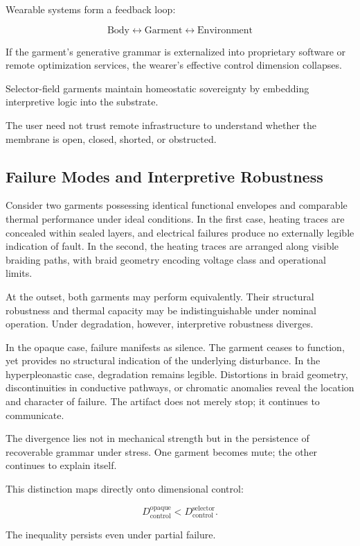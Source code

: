 \documentclass[11pt]{article}
\begin{document}
Wearable systems form a feedback loop:

\[
\text{Body} \leftrightarrow \text{Garment} \leftrightarrow \text{Environment}
\]

If the garment's generative grammar is externalized into proprietary 
software or remote optimization services, the wearer’s effective 
control dimension collapses.

Selector-field garments maintain homeostatic sovereignty by 
embedding interpretive logic into the substrate.

The user need not trust remote infrastructure to understand 
whether the membrane is open, closed, shorted, or obstructed.

\subsection{Failure Modes and Interpretive Robustness}

Consider two garments possessing identical functional envelopes and
comparable thermal performance under ideal conditions. In the first
case, heating traces are concealed within sealed layers, and electrical
failures produce no externally legible indication of fault. In the
second, the heating traces are arranged along visible braiding paths,
with braid geometry encoding voltage class and operational limits.

At the outset, both garments may perform equivalently. Their structural
robustness and thermal capacity may be indistinguishable under nominal
operation. Under degradation, however, interpretive robustness diverges.

In the opaque case, failure manifests as silence. The garment ceases to
function, yet provides no structural indication of the underlying
disturbance. In the hyperpleonastic case, degradation remains legible.
Distortions in braid geometry, discontinuities in conductive pathways,
or chromatic anomalies reveal the location and character of failure.
The artifact does not merely stop; it continues to communicate.

The divergence lies not in mechanical strength but in the persistence
of recoverable grammar under stress. One garment becomes mute; the
other continues to explain itself.

This distinction maps directly onto dimensional control:

\[
D_{\text{control}}^{\text{opaque}} < D_{\text{control}}^{\text{selector}}.
\]

The inequality persists even under partial failure.
\end{document}

